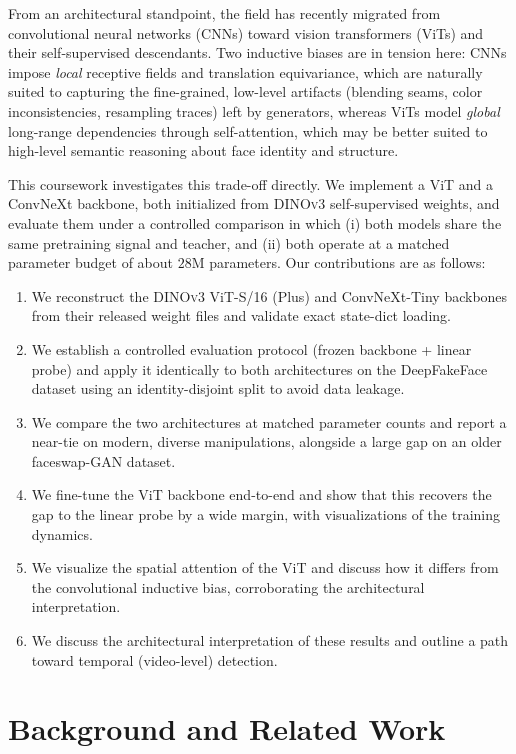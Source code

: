 \documentclass[11pt,a4paper]{article}
\begin{document}
From an architectural standpoint, the field has recently migrated from convolutional neural
networks (CNNs) toward vision transformers (ViTs) and their self-supervised descendants.
Two inductive biases are in tension here: CNNs impose \emph{local} receptive fields and
translation equivariance, which are naturally suited to capturing the fine-grained, low-level
artifacts (blending seams, color inconsistencies, resampling traces) left by generators, whereas
ViTs model \emph{global} long-range dependencies through self-attention, which may be better
suited to high-level semantic reasoning about face identity and structure.

This coursework investigates this trade-off directly. We implement a ViT and a ConvNeXt
backbone, both initialized from \textsc{DINOv3} self-supervised weights, and evaluate them under
a controlled comparison in which (i) both models share the same pretraining signal and teacher,
and (ii) both operate at a matched parameter budget of about $28$M parameters. Our contributions
are as follows:

\begin{enumerate}[leftmargin=1.5em]
  \item We reconstruct the \textsc{DINOv3} ViT-S/16 (Plus) and ConvNeXt-Tiny backbones from
        their released weight files and validate exact state-dict loading.
  \item We establish a controlled evaluation protocol (frozen backbone + linear probe) and apply
        it identically to both architectures on the DeepFakeFace dataset using an identity-disjoint
        split to avoid data leakage.
  \item We compare the two architectures at matched parameter counts and report a near-tie on
        modern, diverse manipulations, alongside a large gap on an older faceswap-GAN dataset.
  \item We fine-tune the ViT backbone end-to-end and show that this recovers the gap to the
        linear probe by a wide margin, with visualizations of the training dynamics.
  \item We visualize the spatial attention of the ViT and discuss how it differs from the
        convolutional inductive bias, corroborating the architectural interpretation.
  \item We discuss the architectural interpretation of these results and outline a path toward
        temporal (video-level) detection.
\end{enumerate}

\section{Background and Related Work}
\end{document}
